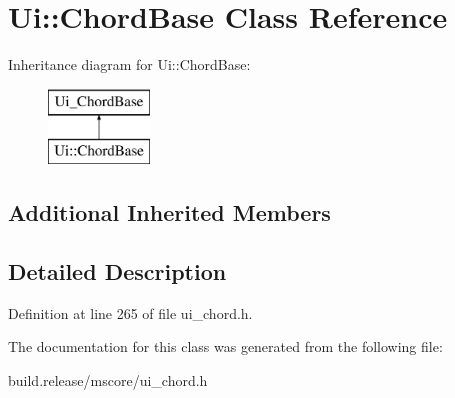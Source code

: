 \hypertarget{class_ui_1_1_chord_base}{}\section{Ui\+:\+:Chord\+Base Class Reference}
\label{class_ui_1_1_chord_base}
Inheritance diagram for Ui\+:\+:Chord\+Base\+:\begin{figure}[H]
\begin{center}
\leavevmode
\includegraphics[height=2.000000cm]{class_ui_1_1_chord_base}
\end{center}
\end{figure}
\subsection*{Additional Inherited Members}


\subsection{Detailed Description}


Definition at line 265 of file ui\+\_\+chord.\+h.



The documentation for this class was generated from the following file\+:\begin{DoxyCompactItemize}
\item 
build.\+release/mscore/ui\+\_\+chord.\+h\end{DoxyCompactItemize}
